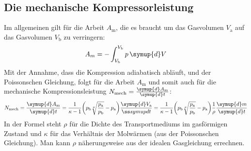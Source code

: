 \subsection{Die mechanische Kompressorleistung}
Im allgemeinen gilt für die Arbeit $A_{\text{m}}$, die es braucht um das Gasvolumen $V_{\text{a}}$ auf das Gasvolumen $V_{\text{b}}$ zu verringern: 
\begin{equation}
    A_m = - \int_{V_{\text{b}}}^{V_{\text{b}}} p\, \symup{d}V
\end{equation}
Mit der Annahme, dass die Kompression adiabatisch abläuft, und der Poissonschen Gleichung, folgt für die Arbeit $A_{\text{m}}$ und somit auch für die mechanische Kompressionsleistung $N_{\text{mech}} = \frac{\symup{d}A_{\text{m}}}{\symup{d}t}$:
\begin{equation}
    N_{\text{mech}} = \frac{\symup{d}A_{\text{m}}}{\symup{d}t} 
    = \frac{1}{\kappa - 1} \biggl( p_{\text{b}} \sqrt[\kappa]{\frac{p_{\text{a}}}{p_{\text{b}}}} - p_{\text{a}} \biggr) \frac{\symup{d}V_{\text{a}}}{ßsymup{d}t}
    = \frac{1}{\kappa -1} \biggl( p_{\text{b}} \sqrt[\kappa]{\frac{p_{\text{a}}}{p_{\text{b}}}} - p_{\text{a}} \biggr) \frac{1}{\rho} \frac{\symup{d}m}{\symup{d}t}
\end{equation}
In der Formel steht $\rho$ für die Dichte des Transportmediums im gasförmigen Zustand und $\kappa$ für das Verhältnis der Molwärmen (aus der Poissonschen Gleichung).
Man kann $\rho$ näherungsweise aus der idealen Gasgleichung errechnen.